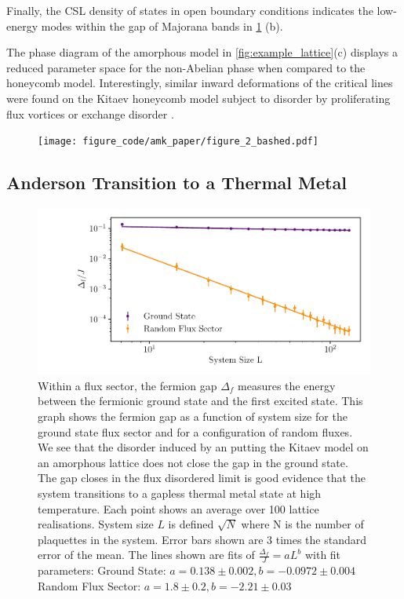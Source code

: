 Finally, the CSL density of states in open boundary conditions indicates
the low-energy modes within the gap of Majorana bands in
\protect\hyperlink{fig:edge_modes}{1} (b).

The phase diagram of the amorphous model in
\protect\hyperlink{fig:example_lattice}{{[}fig:example\_lattice{]}}(c)
displays a reduced parameter space for the non-Abelian phase when
compared to the honeycomb model. Interestingly, similar inward
deformations of the critical lines were found on the Kitaev honeycomb
model subject to disorder by proliferating flux vortices
\autocite{Nasu_Thermal_2015} or exchange disorder
\autocite{knolle_dynamics_2016}.

\begin{figure}
\hypertarget{fig:figure_2_bashed}{%
\centering
\texttt{[image: figure\_code/amk\_paper/figure\_2\_bashed.pdf]}
\caption{}\label{fig:figure_2_bashed}
}
\end{figure}

\hypertarget{anderson-transition-to-a-thermal-metal}{%
\subsection{Anderson Transition to a Thermal
Metal}\label{anderson-transition-to-a-thermal-metal}}

\begin{figure}
\hypertarget{fig:fermion_gap_vs_L}{%
\centering
\includegraphics[width=1.14\textwidth,height=\textheight]{figure_code/amk_chapter/results/fermion_gap_vs_L/fermion_gap_vs_L.pdf}
\caption{Within a flux sector, the fermion gap \(\Delta_f\) measures the
energy between the fermionic ground state and the first excited state.
This graph shows the fermion gap as a function of system size for the
ground state flux sector and for a configuration of random fluxes. We
see that the disorder induced by an putting the Kitaev model on an
amorphous lattice does not close the gap in the ground state. The gap
closes in the flux disordered limit is good evidence that the system
transitions to a gapless thermal metal state at high temperature. Each
point shows an average over 100 lattice realisations. System size \(L\)
is defined \(\sqrt{N}\) where N is the number of plaquettes in the
system. Error bars shown are \(3\) times the standard error of the mean.
The lines shown are fits of \(\tfrac{\Delta_f}{J} = aL ^ b\) with fit
parameters: Ground State: \(a = 0.138 \pm 0.002, b = -0.0972 \pm 0.004\)
Random Flux Sector:
\(a = 1.8 \pm 0.2, b = -2.21 \pm 0.03\)}\label{fig:fermion_gap_vs_L}
}
\end{figure}


